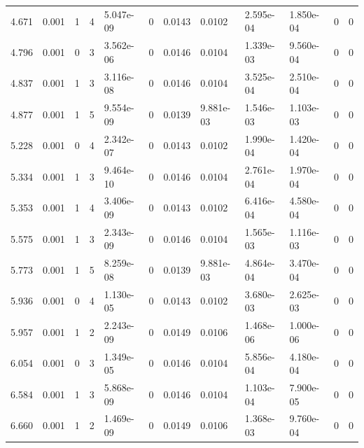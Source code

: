 \documentclass[preview]{standalone}
\begin{document}
{{\begin{tabular}{L{1.2cm}C{1.2cm} C{0.3cm}C{0.5cm} C{1.4cm}C{1.4cm} C{1.4cm}C{1.4cm} C{1.6cm}C{1.6cm} C{1.6cm}C{1.6cm}}
  4.671  &  0.001  & 1     &  4 &  5.047e-09  & 0  &  0.0143&   0.0102& 2.595e-04 & 1.850e-04   &  0 & 0  \\ 
  4.796  &  0.001  & 0     &  3 &  3.562e-06  & 0  &  0.0146&   0.0104& 1.339e-03 & 9.560e-04   &  0 & 0  \\ 
  4.837  &  0.001  & 1     &  3 &  3.116e-08  & 0  &  0.0146&   0.0104& 3.525e-04 & 2.510e-04   &  0 & 0  \\ 
  4.877  &  0.001  & 1     &  5 &  9.554e-09  & 0  &  0.0139&   9.881e-03& 1.546e-03 & 1.103e-03   &  0 & 0  \\ 
  5.228  &  0.001  & 0     &  4 &  2.342e-07  & 0  &  0.0143&   0.0102& 1.990e-04 & 1.420e-04   &  0 & 0  \\ 
  5.334  &  0.001  & 1     &  3 &  9.464e-10  & 0  &  0.0146&   0.0104& 2.761e-04 & 1.970e-04   &  0 & 0  \\ 
  5.353  &  0.001  & 1     &  4 &  3.406e-09  & 0  &  0.0143&   0.0102& 6.416e-04 & 4.580e-04   &  0 & 0  \\ 
  5.575  &  0.001  & 1     &  3 &  2.343e-09  & 0  &  0.0146&   0.0104& 1.565e-03 & 1.116e-03   &  0 & 0  \\ 
  5.773  &  0.001  & 1     &  5 &  8.259e-08  & 0  &  0.0139&   9.881e-03& 4.864e-04 & 3.470e-04   &  0 & 0  \\ 
  5.936  &  0.001  & 0     &  4 &  1.130e-05  & 0  &  0.0143&   0.0102& 3.680e-03 & 2.625e-03   &  0 & 0  \\ 
  5.957  &  0.001  & 1     &  2 &  2.243e-09  & 0  &  0.0149&   0.0106& 1.468e-06 & 1.000e-06   &  0 & 0  \\ 
  6.054  &  0.001  & 0     &  3 &  1.349e-05  & 0  &  0.0146&   0.0104& 5.856e-04 & 4.180e-04   &  0 & 0  \\ 
  6.584  &  0.001  & 1     &  3 &  5.868e-09  & 0  &  0.0146&   0.0104& 1.103e-04 & 7.900e-05   &  0 & 0  \\ 
  6.660  &  0.001  & 1     &  2 &  1.469e-09  & 0  &  0.0149&   0.0106& 1.368e-03 & 9.760e-04   &  0 & 0  \\ 
\hline 
\end{tabular} 

}}
\end{document}
